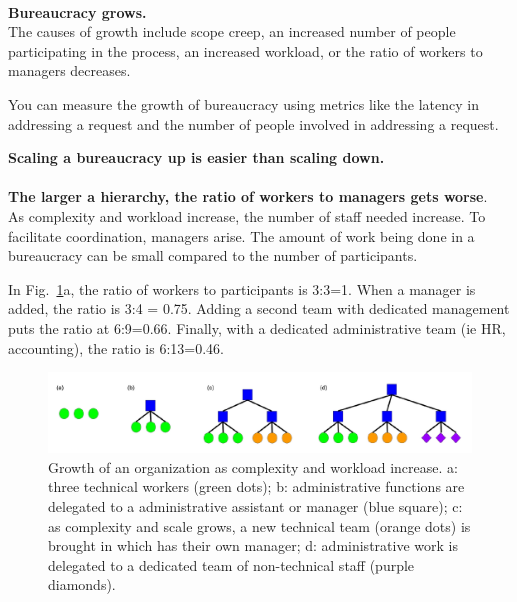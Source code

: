 \ \\

\textbf{Bureaucracy grows.}\\
The causes of growth include
scope creep, an increased number of people participating in the process, an increased workload, or the ratio of workers to managers decreases. 

You can measure the growth of bureaucracy using metrics like the latency in addressing a request and 
the number of people involved in addressing a request.  

\textbf{Scaling a bureaucracy up is easier than scaling down.}\\
\ \\

\textbf{The larger a hierarchy, the ratio of workers to managers gets worse}. \\

As complexity and workload increase, the number of staff needed increase. To facilitate coordination, managers arise. The amount of work being done in a bureaucracy can be small compared to the number of participants.

In Fig.~\ref{fig:growth_of_bureaucracy}a, the ratio of workers to participants is 3:3=1. When a manager is added, the ratio is 3:4 = 0.75. Adding a second team with dedicated management puts the ratio at 6:9=0.66. Finally, with a dedicated administrative team (ie HR, accounting), the ratio is 6:13=0.46.

    \begin{figure}
        \centering
        \includegraphics[width=1\textwidth]{images/growth-of-bureaucracy.pdf}
        \caption{Growth of an organization as complexity and workload increase. a: three technical workers (green dots); b: administrative functions are delegated to a administrative assistant or manager (blue square); c: as complexity and scale grows, a new technical team (orange dots) is brought in which has their own manager; d: administrative work is delegated to a dedicated team of non-technical staff (purple diamonds).}
        \label{fig:growth_of_bureaucracy}
    \end{figure}

